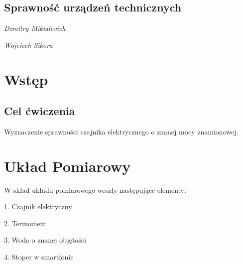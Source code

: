 \documentclass[]{article}
\begin{document}
\begin{figure}[tp!]
\end{figure}

\begin{center}
	\section*{Sprawność urządzeń technicznych }
	\emph{Dzmitry Mikialevich}
\end{center}
\begin{center}
	\emph{Wojciech Sikora}
\end{center}
\tableofcontents
\newpage

\section{Wstęp}

\subsection{Cel ćwiczenia}
Wyznaczenie sprawności czajnika elektrycznego o znanej mocy znamionowej.

    


    
\section{Układ Pomiarowy}
W skład układu pomiarowego weszły następujące elementy:
\newline

1. Czajnik elektryczny


2. Termometr


3. Woda o znanej objętości

4. Stoper w smartfonie
\end{document}
